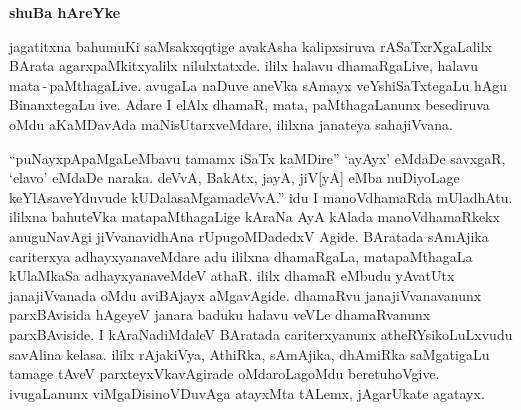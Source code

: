 





\begin{center}
{\Huge\bfseries shuBa hAreYke}
\end{center}

\thispagestyle{empty}

\bigskip

jagatitxna bahumuKi saMsakxqqtige avakAsha kalipxsiruva rASaTxrXgaLalilx BArata agarxpaMkitxyalilx nilulxtatxde. ililx halavu dhamaRgaLive, halavu mata\,-\,paMthagaLive. avugaLa naDuve aneVka sAmayx veYshiSaTxtegaLu hAgu BinanxtegaLu ive. Adare I elAlx dhamaR, mata, paMthagaLanunx besediruva oMdu aKaMDavAda maNisUtarxveMdare, ililxna janateya sahajiVvana. 

\medskip

``puNayxpApaMgaLeMbavu tamamx iSaTx kaMDire'' `ayAyx' eMdaDe savxgaR, `elavo'  eMdaDe naraka. deVvA, BakAtx, jayA, jiV[yA] eMba nuDiyoLage keYlAsaveYduvude kUDalasaMgamadeVvA.'' idu I manoV\-dhamaRda mUladhAtu. ililxna bahuteVka mata\-paMthagaLige kAraNa AyA kAlada manoVdhamaRkekx anuguNavAgi jiVvana\-vidhAna rUpugoMDadedxV Agide. BAratada sAmAjika cariterxya adhayxyanaveMdare adu ililxna dhamaRgaLa, matapaMthagaLa kUlaMkaSa \hbox{adhayxyanaveMdeV} athaR. ililx dhamaR eMbudu yAvatUtx janajiVvanada oMdu aviBAjayx aMgavAgide. dhamaRvu janajiVvanavanunx parxBAvisida hAgeyeV janara baduku halavu veVLe dhamaRvanunx parxBAviside. I kAraNadiMdaleV BAratada cariterxyanunx atheRYsikoLuLxvudu savAlina kelasa. ililx \hbox{rAjakiVya}, AthiRka, sAmAjika, dhAmiRka saMgatigaLu tamage tAveV parxteyxVkavAgirade oMdaroLagoMdu beretuhoVgive. ivu\-gaLanunx viMgaDisi\break noVDuvAga atayxMta tALemx, jAgarUkate agatayx.

\medskip

